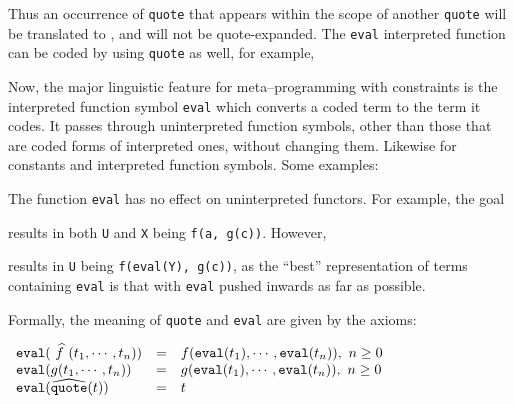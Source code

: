 \noindent
Thus an occurrence of
{\tt quote} that appears within the scope of another {\tt quote} will be
translated to , and will not be quote-expanded.
The {\tt eval} interpreted function can be coded by using {\tt quote}
as well, for example,


Now, the major linguistic feature for meta--programming with constraints 
is the interpreted function symbol {\tt eval}
which converts a coded term to the term it codes.  It passes through
uninterpreted function symbols, other than those that are coded forms of
interpreted ones, without changing them.  Likewise for constants and
interpreted function symbols.  Some examples:


\noindent
The function {\tt eval} has no effect on uninterpreted functors.
For example, the goal


\noindent
results in both {\tt U} and {\tt X} being {\tt f(a, g(c))}.  However,


\noindent
results in {\tt U} being {\tt f(eval(Y), g(c))}, 
as the ``best'' representation of terms
containing {\tt eval} is that with {\tt eval} pushed inwards as far as
possible.  

Formally, the meaning of {\tt quote} and {\tt eval} are given
by the axioms: 

\begin{center}
$
\begin{array}{lcl}
{\tt eval}(\mbox{ $\widehat{f}$ }(t_1, \cdots, t_n)) & = & f({\tt eval}(t_1), \cdots,
{\tt eval}(t_n)), \ n \geq 0 \\
{\tt eval}(g(t_1, \cdots, t_n)) & = & g({\tt eval}(t_1), \cdots,
{\tt eval}(t_n)), \ n \geq 0  \\
{\tt eval}(\mbox{$\widehat{\mbox{\tt quote}}$}(t)) & = & t
\end{array}
$
\end{center}


